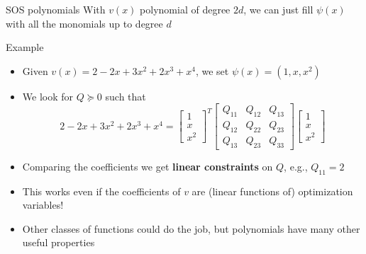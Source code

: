 \documentclass[aspectratio=169]{beamer}
\begin{document}
\begin{frame}{SOS polynomials}
With $v(x)$ polynomial of degree $2d$, we can just fill $\psi(x)$ with all the monomials up to degree $d$
\begin{block}{Example}
\begin{itemize}
\item
Given $v(x) = 2 - 2 x + 3 x^2 + 2 x^3 + x^4$, we set $\psi(x) = (1, x, x^2)$
\item
We look for $Q \succeq 0$ such that
$$
2 - 2 x + 3 x^2 + 2 x^3 + x^4 =
\begin{bmatrix} 1 \\ x \\ x^2 \end{bmatrix}^T
\begin{bmatrix} Q_{11} & Q_{12} & Q_{13} \\ Q_{12} & Q_{22} & Q_{23} \\ Q_{13} & Q_{23} & Q_{33} \end{bmatrix}
\begin{bmatrix} 1 \\ x \\ x^2 \end{bmatrix}
$$
\item
Comparing the coefficients we get \textbf{linear constraints} on $Q$, e.g., $Q_{11} = 2$
\end{itemize}
\end{block}
\begin{itemize}
\item
This works even if the coefficients of $v$ are (linear functions of) optimization variables!
\item
Other classes of functions could do the job, but polynomials have many other useful properties
\end{itemize}

\end{frame}

\end{document}

